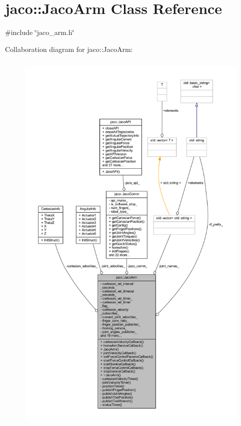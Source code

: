 \hypertarget{classjaco_1_1JacoArm}{}\section{jaco\+:\+:Jaco\+Arm Class Reference}
\label{classjaco_1_1JacoArm}


{\ttfamily \#include \char`\"{}jaco\+\_\+arm.\+h\char`\"{}}



Collaboration diagram for jaco\+:\+:Jaco\+Arm\+:
\nopagebreak
\begin{figure}[H]
\begin{center}
\leavevmode
\includegraphics[height=550pt]{da/d76/classjaco_1_1JacoArm__coll__graph}
\end{center}
\end{figure}
